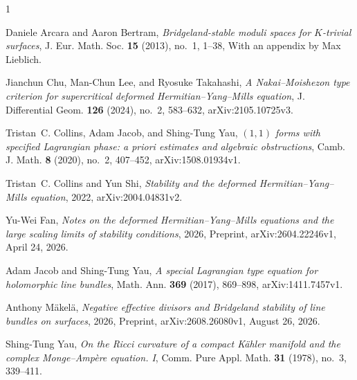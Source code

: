 \documentclass[12pt,reqno]{amsart}
\numberwithin{equation}{section}
\theoremstyle{plain}
\theoremstyle{definition}
\theoremstyle{remark}
\begin{document}

\providecommand{\bysame}{\leavevmode\hbox to3em{\hrulefill}\thinspace}
\providecommand{\MR}{\relax\ifhmode\unskip\space\fi MR }
\providecommand{\MRhref}[2]{%
  \href{http://www.ams.org/mathscinet-getitem?mr=#1}{#2}
}
\providecommand{\href}[2]{#2}
\begin{thebibliography}{1}

Daniele Arcara and Aaron Bertram, \emph{Bridgeland-stable moduli spaces for
  {$K$}-trivial surfaces}, J. Eur. Math. Soc. \textbf{15} (2013), no.~1, 1--38,
  With an appendix by Max Lieblich.

Jianchun Chu, Man-Chun Lee, and Ryosuke Takahashi, \emph{A {Nakai--Moishezon}
  type criterion for supercritical deformed {Hermitian--Yang--Mills} equation},
  J. Differential Geom. \textbf{126} (2024), no.~2, 583--632,
  arXiv:2105.10725v3.

Tristan~C. Collins, Adam Jacob, and Shing-Tung Yau, \emph{$(1,1)$ forms with
  specified {Lagrangian} phase: a priori estimates and algebraic obstructions},
  Camb. J. Math. \textbf{8} (2020), no.~2, 407--452, arXiv:1508.01934v1.

Tristan~C. Collins and Yun Shi, \emph{Stability and the deformed
  {Hermitian--Yang--Mills} equation}, 2022, arXiv:2004.04831v2.

Yu-Wei Fan, \emph{Notes on the deformed {Hermitian--Yang--Mills} equations and
  the large scaling limits of stability conditions}, 2026, Preprint,
  arXiv:2604.22246v1, April 24, 2026.

Adam Jacob and Shing-Tung Yau, \emph{A special {Lagrangian} type equation for
  holomorphic line bundles}, Math. Ann. \textbf{369} (2017), 869--898,
  arXiv:1411.7457v1.

Anthony M{\"a}kel{\"a}, \emph{Negative effective divisors and {Bridgeland}
  stability of line bundles on surfaces}, 2026, Preprint, arXiv:2608.26080v1,
  August 26, 2026.

Shing-Tung Yau, \emph{On the {Ricci} curvature of a compact {K\"ahler} manifold
  and the complex {Monge--Amp\`ere} equation. {I}}, Comm. Pure Appl. Math.
  \textbf{31} (1978), no.~3, 339--411.

\end{thebibliography}
\end{document}
